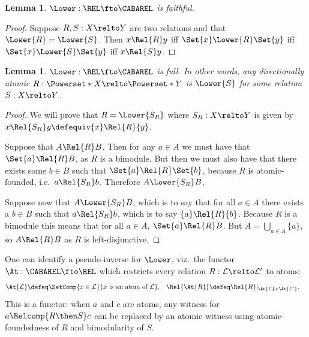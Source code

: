 \documentclass[10pt,a4paper]{article}
\newtheorem{lemma}[theorem]{Lemma}
\begin{document}
\begin{lemma}\label{lem:lower-faithful}
  \(\Lower : \REL \fto \CABAREL\) is faithful.
\end{lemma}
\begin{proof}
  Suppose \(R, S : X \relto Y\) are two relations and that
  \(\Lower{R} = \Lower{S}\). Then \(x \Rel{R} y\) iff
  \(\Set{x} \Lower{R} \Set{y}\) iff \(\Set{x} \Lower{S} \Set{y}\) iff
  \(x \Rel{S} y\).
\end{proof}

\begin{lemma}\label{lem:cabarel-then-lower}
  \(\Lower : \REL \fto \CABAREL\) is full. In other words, any
  directionally atomic \(R : \Powerset*{X} \relto \Powerset*{Y}\) is
  \(\Lower{S}\) for some relation \(S : X \relto Y \).
\end{lemma}
\begin{proof}
  We will prove that $R = \Lower{S_R}$ where $S_R : X \relto Y$ is given by \(x
  \Rel{S_R} y \defequiv \{ x \} \Rel{R} \{ y \}\).

  Suppose that \(A \Rel{R} B\). Then for any \(a \in A\) we must have that
  \(\Set{a} \Rel{R} B\), as \(R\) is a bimodule. But then we must also have that
  there exists some \(b \in B\) such that \(\Set{a} \Rel{R} \Set{b}\), because
  \(R\) is atomic-founded, i.e.\ $a \Rel{S_R} b$. Therefore \(A \Lower{S_R} B\).

  Suppose now that \(A \Lower{S_R} B\), which is to say that for all $a \in A$ there
  exists a $b \in B$ such that $a \Rel{S_R} b$, which is to say $\{a\} \Rel{R}
  \{b\}$. Because \(R\) is a bimodule this means that for all \(a \in A\),
  \(\Set{a} \Rel{R} B\). But $A = \bigcup_{a \in A} \{ a \}$, so \(A \Rel{R}
  B\) as \(R\) is left-disjunctive.
\end{proof}

One can identify a pseudo-inverse for \(\Lower\), viz.\ the functor \(\At :
\CABAREL \fto \REL\) which restricts every relation \(R : \mathcal{L} \relto
\mathcal{L}'\) to atoms:
\begin{align*}
  \At{\mathcal{L}} &\defeq \SetComp{x \in \mathcal{L}}{x \text{ is an atom of }
                     \mathcal{L}},
  &
    \Rel{\At{R}} &\defeq \Rel{R}|_{\At{\mathcal{L}} \times \At{\mathcal{L}'}}.
\end{align*}
This is a functor: when \(a\) and \(c\) are atoms, any witness for
\(a \Relcomp{R \then S} c\) can be replaced by an atomic witness using
atomic-foundedness of \(R\) and bimodularity of \(S\).
\end{document}
